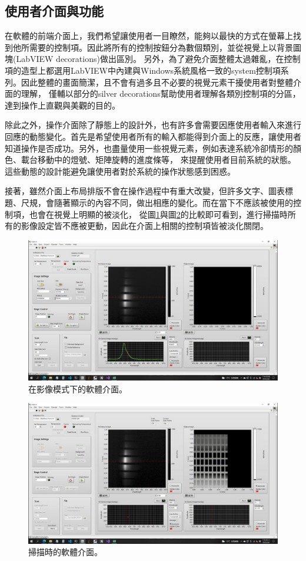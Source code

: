 \documentclass[12pt]{article}
\begin{document}
\subsection{使用者介面與功能}
在軟體的前端介面上，我們希望讓使用者一目瞭然，能夠以最快的方式在螢幕上找到他所需要的控制項。因此將所有的控制按鈕分為數個類別，並從視覺上以背景圖塊(LabVIEW decorations)做出區別。
另外，為了避免介面整體太過雜亂，在控制項的造型上都選用LabVIEW中內建與Windows系統風格一致的system控制項系列。因此整體的畫面簡潔，且不會有過多且不必要的視覺元素干擾使用者對整體介面的理解，
僅輔以部分的silver decorations幫助使用者理解各類別控制項的分區，達到操作上直觀與美觀的目的。

除此之外，操作介面除了靜態上的設計外，也有許多會需要因應使用者輸入來進行回應的動態變化。首先是希望使用者所有的輸入都能得到介面上的反應，讓使用者知道操作是否成功。另外，也盡量使用一些視覺元素，例如表達系統冷卻情形的顏色、載台移動中的燈號、矩陣旋轉的進度條等，
來提醒使用者目前系統的狀態。這些動態的設計能避免讓使用者對於系統的操作狀態感到困惑。

接著，雖然介面上布局排版不會在操作過程中有重大改變，但許多文字、圖表標題、尺規，會隨著顯示的內容不同，做出相應的變化。而在當下不應該被使用的控制項，也會在視覺上明顯的被淡化，
從圖\ref{figure: acquire mode}與圖\ref{figure: scanning}的比較即可看到，進行掃描時所有的影像設定皆不應被更動，因此在介面上相關的控制項皆被淡化關閉。
\begin{figure}
    \centering
    \includegraphics[width=\linewidth]{acquire.jpeg}
    \caption{在影像模式下的軟體介面。}
    \label{figure: acquire mode}
\end{figure}
\begin{figure}
    \centering
    \includegraphics[width=\linewidth]{scanning.jpeg}
    \caption{掃描時的軟體介面。}
    \label{figure: scanning}
\end{figure}
\end{document}
